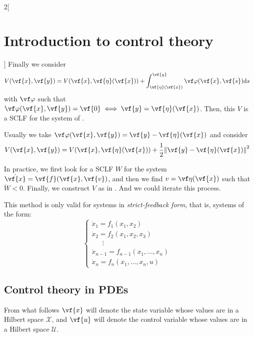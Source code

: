 \documentclass[../../../main_math.tex]{subfiles}
\begin{document}
\begin{multicols}{2}[\section{Introduction to control theory}]
  Finally we consider $$
    V(\vf{x}, \vf{y}) = V(\vf{x}, \vf{\eta}(\vf{x})) +\int_{\vf{\eta}(\vf{x})}^{\vf{y}}\vf\varphi(\vf{x}, \vf{s})\dd s
  $$
  with $\vf\varphi$ such that $\vf\varphi(\vf{x}, \vf{y}) = \vf{0}\iff \vf{y} = \vf{\eta}(\vf{x})$. Then, this $V$ is a SCLF for the system of .
  \begin{remark}
    Usually we take $\vf\varphi(\vf{x}, \vf{y}) = \vf{y}-\vf{\eta}(\vf{x})$ and consider
    \begin{equation}\label{ICT:backsteppingV}
      V(\vf{x}, \vf{y}) = V(\vf{x}, \vf{\eta}(\vf{x})) + \frac{1}{2}\norm{\vf{y}-\vf{\eta}(\vf{x})}^2
    \end{equation}
  \end{remark}
  In practice, we first look for a SCLF $W$ for the system $\dot{\vf{x}} = \vf{f}(\vf{x}, \vf{v})$, and then we find $v=\vf\eta(\vf{x})$ such that $\dot{W} < 0$. Finally, we construct $V$ as in . And we could iterate this process.
  \begin{remark}
    This method is only valid for systems in \emph{strict-feedback form}, that is, systems of the form:
    $$
      \begin{cases}
        \dot{x}_1 = f_1(x_1, x_2)                 \\
        \dot{x}_2 = f_2(x_1, x_2, x_3)            \\
        \quad\;\;\vdots                           \\
        \dot{x}_{n-1} = f_{n-1}(x_1, \ldots, x_n) \\
        \dot{x}_n = f_n(x_1, \ldots, x_n, u)
      \end{cases}
    $$
  \end{remark}
  \subsection{Control theory in PDEs}
  From what follows $\vf{x}$ will denote the state variable whose values are in a Hilbert space $\mathcal{X}$, and $\vf{u}$ will denote the control variable whose values are in a Hilbert space $\mathcal{U}$.

\end{multicols}
\end{document}
